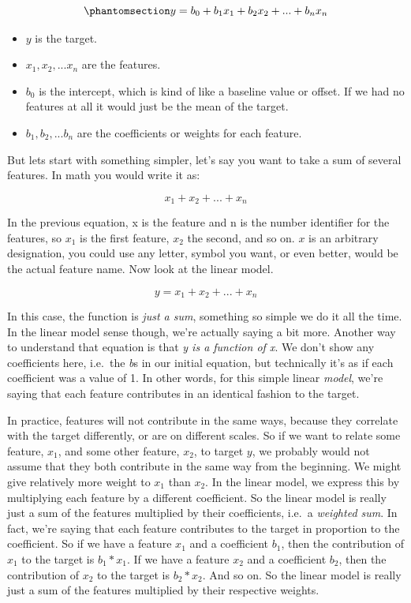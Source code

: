 \documentclass[
  letterpaper,
]{krantz}
\providecommand{\tightlist}{%
  \setlength{\itemsep}{0pt}\setlength{\parskip}{0pt}}\usepackage{longtable,booktabs,array}
\begin{document}
\begin{equation}\phantomsection\label{eq-lm-basic}{
y = b_0 + b_1x_1 + b_2x_2 + ... + b_nx_n
}\end{equation}

\begin{itemize}
\tightlist
\item
  \(y\) is the target.
\item
  \(x_1, x_2, ... x_n\) are the features.
\item
  \(b_0\) is the intercept, which is kind of like a baseline value or
  offset. If we had no features at all it would just be the mean of the
  target.
\item
  \(b_1, b_2, ... b_n\) are the coefficients or weights for each
  feature.
\end{itemize}

But lets start with something simpler, let's say you want to take a sum
of several features. In math you would write it as:

\[
x_1 + x_2 + ... + x_n
\]

In the previous equation, x is the feature and n is the number
identifier for the features, so \(x_1\) is the first feature, \(x_2\)
the second, and so on. \(x\) is an arbitrary designation, you could use
any letter, symbol you want, or even better, would be the actual feature
name. Now look at the linear model.

\[
y = x_1 + x_2 + ... + x_n
\]

In this case, the function is \emph{just a sum}, something so simple we
do it all the time. In the linear model sense though, we're actually
saying a bit more. Another way to understand that equation is that
\emph{y is a function of x}. We don't show any coefficients here,
i.e.~the \emph{b}s in our initial equation, but technically it's as if
each coefficient was a value of 1. In other words, for this simple
linear \emph{model}, we're saying that each feature contributes in an
identical fashion to the target.

In practice, features will not contribute in the same ways, because they
correlate with the target differently, or are on different scales. So if
we want to relate some feature, \(x_1\), and some other feature,
\(x_2\), to target \(y\), we probably would not assume that they both
contribute in the same way from the beginning. We might give relatively
more weight to \(x_1\) than \(x_2\). In the linear model, we express
this by multiplying each feature by a different coefficient. So the
linear model is really just a sum of the features multiplied by their
coefficients, i.e.~a \emph{weighted sum}. In fact, we're saying that
each feature contributes to the target in proportion to the coefficient.
So if we have a feature \(x_1\) and a coefficient \(b_1\), then the
contribution of \(x_1\) to the target is \(b_1*x_1\). If we have a
feature \(x_2\) and a coefficient \(b_2\), then the contribution of
\(x_2\) to the target is \(b_2 * x_2\). And so on. So the linear model
is really just a sum of the features multiplied by their respective
weights.
\end{document}
